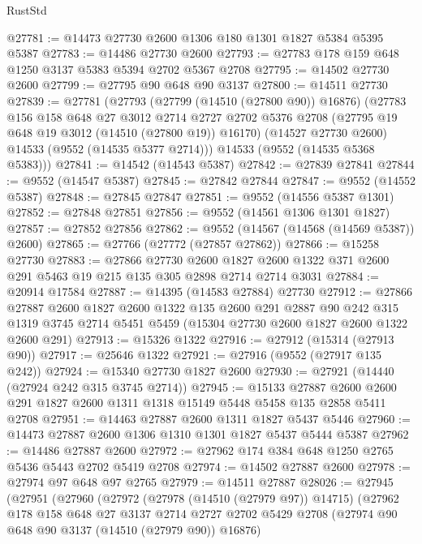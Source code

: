 \begin{lexlean}{RustStd}
\begin{coremodule}
@27781 := @14473 @27730 @2600 @1306 @180 @1301 @1827 @5384 @5395 @5387
@27783 := @14486 @27730 @2600
@27793 := @27783 @178 @159 @648 @1250 @3137 @5383 @5394 @2702 @5367 @2708
@27795 := @14502 @27730 @2600
@27799 := @27795 @90 @648 @90 @3137
@27800 := @14511 @27730
@27839 := @27781
    (@27793
      (@27799 (@14510 (@27800 @90)) @16876)
      (@27783
        @156
        @158
        @648
        @27
        @3012
        @2714
        @2727
        @2702
        @5376
        @2708
        (@27795 @19 @648 @19 @3012 (@14510 (@27800 @19)) @16170)
        (@14527 @27730 @2600)
        @14533
        (@9552 (@14535 @5377 @2714)))
      @14533
      (@9552 (@14535 @5368 @5383)))
@27841 := @14542 (@14543 @5387)
@27842 := @27839 @27841
@27844 := @9552 (@14547 @5387)
@27845 := @27842 @27844
@27847 := @9552 (@14552 @5387)
@27848 := @27845 @27847
@27851 := @9552 (@14556 @5387 @1301)
@27852 := @27848 @27851
@27856 := @9552 (@14561 @1306 @1301 @1827)
@27857 := @27852 @27856
@27862 := @9552 (@14567 (@14568 (@14569 @5387)) @2600)
@27865 := @27766 (@27772 (@27857 @27862))
@27866 := @15258 @27730
@27883 := @27866
    @27730
    @2600
    @1827
    @2600
    @1322
    @371
    @2600
    @291
    @5463
    @19
    @215
    @135
    @305
    @2898
    @2714
    @2714
    @3031
@27884 := @20914 @17584
@27887 := @14395 (@14583 @27884) @27730
@27912 := @27866
    @27887
    @2600
    @1827
    @2600
    @1322
    @135
    @2600
    @291
    @2887
    @90
    @242
    @315
    @1319
    @3745
    @2714
    @5451
    @5459
    (@15304 @27730 @2600 @1827 @2600 @1322 @2600 @291)
@27913 := @15326 @1322
@27916 := @27912 (@15314 (@27913 @90))
@27917 := @25646 @1322
@27921 := @27916 (@9552 (@27917 @135 @242))
@27924 := @15340 @27730 @1827 @2600
@27930 := @27921 (@14440 (@27924 @242 @315 @3745 @2714))
@27945 := @15133
    @27887
    @2600
    @2600
    @291
    @1827
    @2600
    @1311
    @1318
    @15149
    @5448
    @5458
    @135
    @2858
    @5411
    @2708
@27951 := @14463 @27887 @2600 @1311 @1827 @5437 @5446
@27960 := @14473 @27887 @2600 @1306 @1310 @1301 @1827 @5437 @5444 @5387
@27962 := @14486 @27887 @2600
@27972 := @27962 @174 @384 @648 @1250 @2765 @5436 @5443 @2702 @5419 @2708
@27974 := @14502 @27887 @2600
@27978 := @27974 @97 @648 @97 @2765
@27979 := @14511 @27887
@28026 := @27945
    (@27951
      (@27960
        (@27972
          (@27978 (@14510 (@27979 @97)) @14715)
          (@27962
            @178
            @158
            @648
            @27
            @3137
            @2714
            @2727
            @2702
            @5429
            @2708
            (@27974 @90 @648 @90 @3137 (@14510 (@27979 @90)) @16876)

\end{coremodule}
\end{lexlean}
